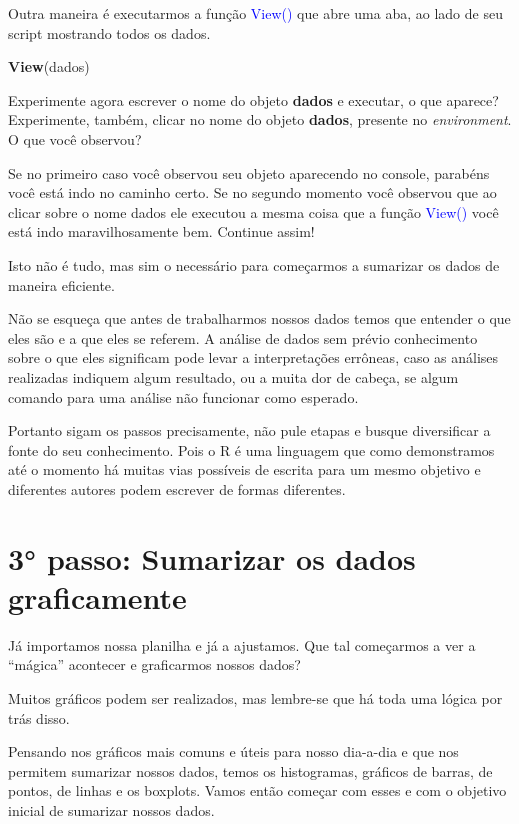 \documentclass[14pt,titlepage, oneside, openany, a4paper]{book}
\newenvironment{Shaded}{\begin{snugshade}}{\end{snugshade}}
\newcommand{\KeywordTok}[1]{\textcolor[rgb]{0.13,0.29,0.53}{\textbf{#1}}}
\newcommand{\NormalTok}[1]{#1}
\begin{document}
Outra maneira é executarmos a função \textcolor{blue}{View()} que abre uma aba, ao lado de seu script mostrando todos os dados.

\begin{Shaded}
\begin{Highlighting}[]
\KeywordTok{View}\NormalTok{(dados)}
\end{Highlighting}
\end{Shaded}

Experimente agora escrever o nome do objeto \textbf{dados} e executar, o que aparece? Experimente, também, clicar no nome do objeto \textbf{dados}, presente no \emph{environment}. O que você observou?

Se no primeiro caso você observou seu objeto aparecendo no console, parabéns você está indo no caminho certo. Se no segundo momento você observou que ao clicar sobre o nome dados ele executou a mesma coisa que a função \textcolor{blue}{View()} você está indo maravilhosamente bem. Continue assim!

Isto não é tudo, mas sim o necessário para começarmos a sumarizar os dados de maneira eficiente.

Não se esqueça que antes de trabalharmos nossos dados temos que entender o que eles são e a que eles se referem. A análise de dados sem prévio conhecimento sobre o que eles significam pode levar a interpretações errôneas, caso as análises realizadas indiquem algum resultado, ou a muita dor de cabeça, se algum comando para uma análise não funcionar como esperado.

Portanto sigam os passos precisamente, não pule etapas e busque diversificar a fonte do seu conhecimento. Pois o R é uma linguagem que como demonstramos até o momento há muitas vias possíveis de escrita para um mesmo objetivo e diferentes autores podem escrever de formas diferentes.

\hypertarget{passo-sumarizar-os-dados-graficamente}{%
\section{3° passo: Sumarizar os dados graficamente}\label{passo-sumarizar-os-dados-graficamente}}

Já importamos nossa planilha e já a ajustamos. Que tal começarmos a ver a ``mágica'' acontecer e graficarmos nossos dados?

Muitos gráficos podem ser realizados, mas lembre-se que há toda uma lógica por trás disso.

Pensando nos gráficos mais comuns e úteis para nosso dia-a-dia e que nos permitem sumarizar nossos dados, temos os histogramas, gráficos de barras, de pontos, de linhas e os boxplots. Vamos então começar com esses e com o objetivo inicial de sumarizar nossos dados.
\end{document}
